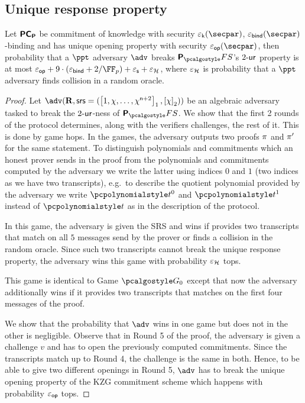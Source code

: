 \documentclass[runningheads,11pt]{llncs}
\begin{document}
\subsection{Unique response property}
\begin{lemma}
	\label{lem:plonkprot_ur}
  Let $\bm{\mathsf{PC}}_{\bm{\mathsf{P}}}$ be commitment of knowledge with security $\epsk(\secpar)$,
  $\epsbind(\secpar)$-binding and has unique opening property with security
  $\epsop(\secpar)$, then probability that a $\ppt$ adversary $\adv$ breaks
  $\plonkprotfs$'s ${2\text{-}\mathsf{ur}}$ property is at most
  $\epsop + 9 \cdot (\epsbind + \infrac{2}{\FF_p}) + \epss + \epsro$, where
  $\varepsilon_{\mathcal{H}}$ is probability that a $\ppt$ adversary finds collision in a random
  oracle.
\end{lemma}
\begin{proof}
  Let
  $\adv(\REL,\srs = (\gone{1, \chi, \ldots, \chi^{\noofc + 2}}, \gtwo{\chi}))$
  be an algebraic adversary tasked to break the ${2\text{-}\mathsf{ur}}$-ness of
  $\plonkprotfs$. We show that the first 2 rounds of the protocol determines,
  along with the verifiers challenges, the rest of it.  This is done by game
  hops. In the games, the adversary outputs two proofs $\pi$ and
  $\pi'$ for the same statement.  To distinguish polynomials and
  commitments which an honest prover sends in the proof from the polynomials and
  commitments computed by the adversary we write the latter using indices $0$
  and $1$ (two indices as we have two transcripts), e.g.~to describe the
  quotient polynomial provided by the adversary we write $\p{t}^0$ and $\p{t}^1$
  instead of $\p{t}$ as in the description of the protocol.

   In this game, the adversary is given the SRS and wins if provides two
  transcripts that match on all $5$ messages send by the prover or finds a
  collision in the random oracle. Since such two transcripts cannot break the
  unique response property, the adversary wins this game with probability
  $\varepsilon_{\mathcal{H}}$ tops.

   This game is identical to Game $\game{0}$ except that now the
  adversary additionally wins if it provides two transcripts that matches on the first four
  messages of the proof.

   We show that the probability that $\adv$
  wins in one game but does not in the other is negligible.  Observe that in
  Round 5 of the proof, the adversary is given a challenge $v$ and has to open
  the previously computed commitments. Since the transcripts match up to Round
  4, the challenge is the same in both. Hence, to be able to give two different
  openings in Round 5, $\adv$ has to break the unique opening property of the
  KZG commitment scheme which happens with probability $\varepsilon_{\mathsf{op}}$ tops.


\end{proof}
\end{document}
